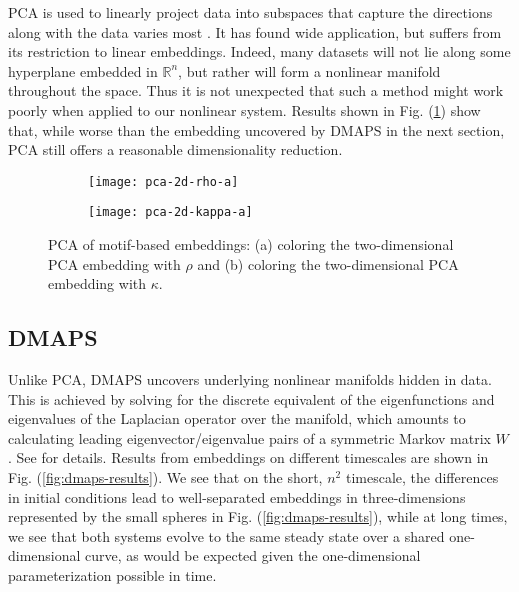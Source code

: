 \documentclass[epjST, final]{svjour}
\begin{document}
\begin{onehalfspace}
PCA is used to linearly project data into subspaces that capture the
directions along with the data varies most
\cite{jolliffe_principal_2014}. It has found wide application, but
suffers from its restriction to linear embeddings. Indeed, many
datasets will not lie along some hyperplane embedded in
$\mathbb{R}^n$, but rather will form a nonlinear manifold throughout
the space. Thus it is not unexpected that such a method might work
poorly when applied to our nonlinear system. Results shown in
Fig. (\ref{fig:pca}) show that, while worse than the embedding
uncovered by DMAPS in the next section, PCA still offers a reasonable
dimensionality reduction.

\begin{figure}[h!]
  \vspace{-5mm}
  \centering
  \begin{subfigure}{0.49\textwidth}
    \centering
    \texttt{[image: pca-2d-rho-a]}
    \subcaption{\label{fig:pca-rho}}
  \end{subfigure} %
  \begin{subfigure}{0.49\textwidth}
    \centering
    \texttt{[image: pca-2d-kappa-a]}
    \subcaption{\label{fig:pca-kappa}}
  \end{subfigure}%
  \caption{PCA of motif-based embeddings: (a) coloring the
    two-dimensional PCA embedding with $\rho$ and (b) coloring the
    two-dimensional PCA embedding with $\kappa$. \label{fig:pca}}
\end{figure}

\subsection{DMAPS}

Unlike PCA, DMAPS uncovers underlying nonlinear manifolds hidden in data. This is achieved by solving for the discrete equivalent of the eigenfunctions and eigenvalues of the Laplacian operator over the manifold, which amounts to calculating leading eigenvector/eigenvalue pairs of a symmetric Markov matrix $W$. See \cite{coifman_diffusion_2006,nadler_diffusion_2006} for details. Results from embeddings on different timescales are shown in Fig. (\ref{fig:dmaps-results}). We see that on the short, $n^2$ timescale, the differences in initial conditions lead to well-separated embeddings in three-dimensions represented by the small spheres in Fig. (\ref{fig:dmaps-results}), while at long times, we see that both systems evolve to the same steady state over a shared one-dimensional curve, as would be expected given the one-dimensional parameterization possible in time. \\


\end{onehalfspace}
\end{document}
